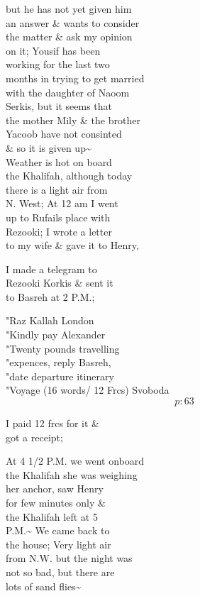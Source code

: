 \documentclass{report}
\begin{document}
	\par{
 	but he has not yet given him\ \\an answer \& wants to consider\ \\the matter \& ask my opinion\ \\on it; Yousif has been\ \\working for the last two\ \\months in trying to get married\ \\with the daughter of Naoom\ \\Serkis, but it seems that\ \\the mother Mily \& the brother\ \\Yacoob have not consinted\ \\\& so it is given up\~{}\ \\Weather is hot on board\ \\the Khalifah, although today\ \\there is a light air from\ \\N. West; At 12 am I went\ \\up to Rufails place with\ \\Rezooki; I wrote a letter\ \\to my wife \& gave it to Henry,\ \\
	}

	\par{
 	I made a telegram to\ \\Rezooki Korkis \& sent it\ \\to Basreh at 2 P.M.;\ \\
	}

	\par{
 	"Raz Kallah London\ \\"Kindly pay Alexander\ \\"Twenty pounds travelling\ \\"expences, reply Basreh,\ \\"date departure itinerary\ \\"Voyage (16 words/ 12 Frcs) Svoboda\ \\
  \[p: 63 \]

	}


	\par{
 	I paid 12 frcs for it \&\ \\got a receipt;\ \\
	}

	\par{
 	At 4 1/2 P.M. we went onboard\ \\the Khalifah she was weighing\ \\her anchor, saw Henry\ \\for few minutes only \&\ \\the Khalifah left at 5\ \\P.M.\~{} We came back to\ \\the house; Very light air\ \\from N.W. but the night was\ \\not so bad, but there are\ \\lots of sand flies\~{}\ \\
	}
\end{document}
